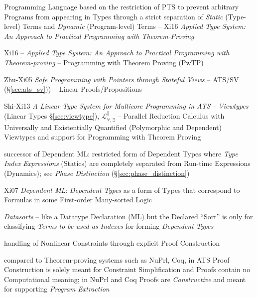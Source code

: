 \begingroup

\newcommand{\lam}{\mathsf{lam}}
\newcommand{\app}{\mathsf{app}}
\newcommand{\slam}{\mathsf{slam}}
\newcommand{\sapp}{\mathsf{sapp}}
\renewcommand{\lett}{\mathsf{let}}
\renewcommand{\inn}{\mathsf{in}}
\newcommand{\INT}{\mathsf{int}}
\newcommand{\BOOL}{\mathsf{bool}}
\newcommand{\Int}{\mathsf{Int}}
\newcommand{\Bool}{\mathsf{Bool}}
\renewcommand{\Nat}{\mathsf{Nat}}
\newcommand{\dtree}{\mathscr{D}}

Programming Language based on the restriction of PTS to prevent
arbitrary Programs from appearing in Types through a strict separation
of \emph{Static} (Type-level) Terms and \emph{Dynamic} (Program-level)
Terms -- Xi16 \emph{Applied Type System: An Approach to Practical
  Programming with Theorem-Proving}

Xi16 -- \emph{Applied Type System: An Approach to Practical
  Programming with Theorem-proving} -- Programming with Theorem
Proving (PwTP)

Zhu-Xi05 \emph{Safe Programming with Pointers through Stateful
  Views} -- ATS/SV (\S\ref{sec:ats_sv})) -- Linear Proofs/Propositions

Shi-Xi13 \emph{A Linear Type System for Multicore Programming in ATS}
-- \emph{Viewtypes} (Linear Types \S\ref{sec:viewtype}),
$\mathcal{L}^\parallel_{\forall, \exists}$ -- Parallel Reduction
Calculus with Universally and Existentially Quantified (Polymorphic
and Dependent) Viewtypes and support for Programming with Theorem
Proving

successor of Dependent ML: restricted form of Dependent Types where
\emph{Type Index Expressions} (Statics) are completely separated from
Run-time Expressions (Dynamics); see \emph{Phase Distinction}
(\S\ref{sec:phase_distinction})

Xi07 \emph{Dependent ML}: \emph{Dependent Types} as a form of Types
that correspond to Formulas in some First-order Many-sorted Logic %

\emph{Datasorts} -- like a Datatype Declaration (ML) but the Declared
``Sort'' is only for classifying \emph{Terms to be used as Indexes}
for forming \emph{Dependent Types}

handling of Nonlinear Constraints through explicit Proof Construction

compared to Theorem-proving systems such as NuPrl, Coq, in ATS Proof
Construction is solely meant for Constraint Simplification and Proofs
contain no Computational meaning; in NuPrl and Coq Proofs are
\emph{Constructive} and meant for supporting \emph{Program Extraction}

